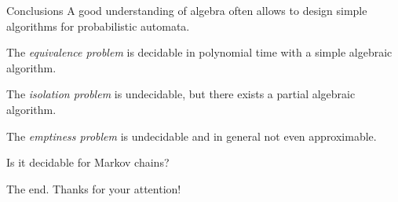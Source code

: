 \documentclass[svgnames]{beamer}
\begin{document}
\begin{frame}{Conclusions}
A good understanding of algebra often allows to design simple algorithms
for probabilistic automata.
\begin{framed}
The \textit{equivalence problem} is decidable in polynomial time with a simple algebraic algorithm.
\end{framed}

\begin{framed}
The \textit{isolation problem} is undecidable,
but there exists a partial algebraic algorithm.
\end{framed}

\begin{framed}
The \textit{emptiness problem} is undecidable and in general not even approximable.

Is it decidable for Markov chains?
\end{framed}
\end{frame}

\begin{frame}{The end.}
Thanks for your attention!
\end{frame}
\end{document}
